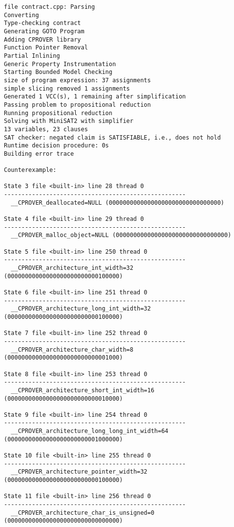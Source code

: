 \begin{lstlisting}
file contract.cpp: Parsing
Converting
Type-checking contract
Generating GOTO Program
Adding CPROVER library
Function Pointer Removal
Partial Inlining
Generic Property Instrumentation
Starting Bounded Model Checking
size of program expression: 37 assignments
simple slicing removed 1 assignments
Generated 1 VCC(s), 1 remaining after simplification
Passing problem to propositional reduction
Running propositional reduction
Solving with MiniSAT2 with simplifier
13 variables, 23 clauses
SAT checker: negated claim is SATISFIABLE, i.e., does not hold
Runtime decision procedure: 0s
Building error trace

Counterexample:

State 3 file <built-in> line 28 thread 0
----------------------------------------------------
  __CPROVER_deallocated=NULL (00000000000000000000000000000000)

State 4 file <built-in> line 29 thread 0
----------------------------------------------------
  __CPROVER_malloc_object=NULL (00000000000000000000000000000000)

State 5 file <built-in> line 250 thread 0
----------------------------------------------------
  __CPROVER_architecture_int_width=32 (00000000000000000000000000100000)

State 6 file <built-in> line 251 thread 0
----------------------------------------------------
  __CPROVER_architecture_long_int_width=32 (00000000000000000000000000100000)

State 7 file <built-in> line 252 thread 0
----------------------------------------------------
  __CPROVER_architecture_char_width=8 (00000000000000000000000000001000)

State 8 file <built-in> line 253 thread 0
----------------------------------------------------
  __CPROVER_architecture_short_int_width=16 (00000000000000000000000000010000)

State 9 file <built-in> line 254 thread 0
----------------------------------------------------
  __CPROVER_architecture_long_long_int_width=64 (00000000000000000000000001000000)

State 10 file <built-in> line 255 thread 0
----------------------------------------------------
  __CPROVER_architecture_pointer_width=32 (00000000000000000000000000100000)

State 11 file <built-in> line 256 thread 0
----------------------------------------------------
  __CPROVER_architecture_char_is_unsigned=0 (00000000000000000000000000000000)


\end{lstlisting}
